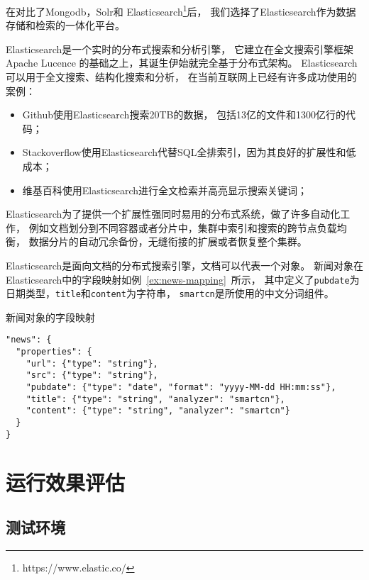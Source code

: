 在对比了Mongodb，Solr和
Elasticsearch\footnote{https://www.elastic.co/}后，
我们选择了Elasticsearch作为数据存储和检索的一体化平台。

Elasticsearch是一个实时的分布式搜索和分析引擎，
它建立在全文搜索引擎框架Apache Lucence
的基础之上，其诞生伊始就完全基于分布式架构。
Elasticsearch可以用于全文搜索、结构化搜索和分析，
在当前互联网上已经有许多成功使用的案例：
\begin{itemize}
\item Github使用Elasticsearch搜索20TB的数据，
包括13亿的文件和1300亿行的代码；
\item Stackoverflow使用Elasticsearch代替SQL全排索引，因为其良好的扩展性和低成本；
\item 维基百科使用Elasticsearch进行全文检索并高亮显示搜索关键词；
\end{itemize}

Elasticsearch为了提供一个扩展性强同时易用的分布式系统，做了许多自动化工作，
例如文档划分到不同容器或者分片中，集群中索引和搜索的跨节点负载均衡，
数据分片的自动冗余备份，无缝衔接的扩展或者恢复整个集群。

Elasticsearch是面向文档的分布式搜索引擎，文档可以代表一个对象。
新闻对象在Elasticsearch中的字段映射如例~\ref{ex:news-mapping}~所示，
其中定义了\texttt{pubdate}为日期类型，\texttt{title}和\texttt{content}为字符串，
\texttt{smartcn}是所使用的中文分词组件。

\begin{example}
\label{ex:news-mapping}
新闻对象的字段映射
\end{example}
\begin{oframed}
\begin{verbatim}
"news": {
  "properties": {
    "url": {"type": "string"},
    "src": {"type": "string"},
    "pubdate": {"type": "date", "format": "yyyy-MM-dd HH:mm:ss"},
    "title": {"type": "string", "analyzer": "smartcn"},
    "content": {"type": "string", "analyzer": "smartcn"}
  }
}
\end{verbatim}
\end{oframed}

\section{运行效果评估}
\label{sec:system-evaluation}

\subsection{测试环境}

